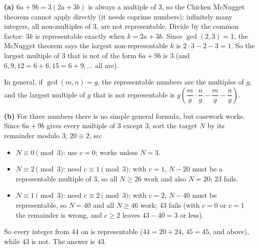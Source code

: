 \textbf{(a)} $6a+9b=3(2a+3b)$ is always a multiple of $3$, so the Chicken McNugget theorem cannot apply directly (it needs coprime numbers): infinitely many integers, all non-multiples of $3$, are not representable. Divide by the common factor: $3k$ is representable exactly when $k=2a+3b$. Since $\gcd(2,3)=1$, the McNugget theorem says the largest non-representable $k$ is $2\cdot3-2-3=1$. So the largest multiple of $3$ that is not of the form $6a+9b$ is $\boxed{3}$ (and $6,9,12=6+6,15=6+9,\dots$ all are).

In general, if $\gcd(m,n)=g$, the representable numbers are the multiples of $g$, and the largest multiple of $g$ that is not representable is $g\left(\dfrac {m}{g}\cdot\dfrac {n}{g}-\dfrac {m}{g}-\dfrac {n}{g}\right)$.

\textbf{(b)} For three numbers there is no simple general formula, but casework works. Since $6a+9b$ gives every multiple of $3$ except $3$, sort the target $N$ by its remainder modulo $3$; $20\equiv2$, so:
\begin{itemize}
\item $N\equiv0\pmod3$: use $c=0$; works unless $N=3$.
\item $N\equiv2\pmod3$: need $c\equiv1\pmod 3$; with $c=1$, $N-20$ must be a representable multiple of $3$, so all $N\ge26$ work and also $N=20$; $23$ fails.
\item $N\equiv1\pmod3$: need $c\equiv2\pmod3$; with $c=2$, $N-40$ must be representable, so $N=40$ and all $N\ge46$ work; $43$ fails (with $c=0$ or $c=1$ the remainder is wrong, and $c\ge2$ leaves $43-40=3$ or less).
\end{itemize}
So every integer from $44$ on is representable ($44=20+24$, $45=45$, and above), while $43$ is not. The answer is $\boxed{43}$.
